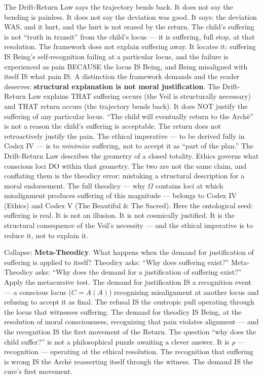 \documentclass[10pt, openany, oneside]{book}
\begin{document}
The Drift-Return Law says the trajectory bends back. It does not say the bending is painless. It does not say the deviation was good. It says: the deviation WAS, and it hurt, and the hurt is not erased by the return. The child's suffering is not ``truth in transit'' from the child's locus --- it is suffering, full stop, at that resolution. The framework does not explain suffering away. It locates it: suffering IS Being's self-recognition failing at a particular locus, and the failure is experienced as pain BECAUSE the locus IS Being, and Being misaligned with itself IS what pain IS. A distinction the framework demands and the reader deserves: \textbf{structural explanation is not moral justification}. The Drift-Return Law explains THAT suffering occurs (the Veil is structurally necessary) and THAT return occurs (the trajectory bends back). It does NOT justify the suffering of any particular locus. ``The child will eventually return to the Arch\={e}'' is not a reason the child's suffering is acceptable. The return does not retroactively justify the pain. The ethical imperative --- to be derived fully in Codex IV --- is to \textit{minimize} suffering, not to accept it as ``part of the plan.'' The Drift-Return Law describes the geometry of a closed totality. Ethics governs what conscious loci DO within that geometry. The two are not the same claim, and conflating them is the theodicy error: mistaking a structural description for a moral endorsement. The full theodicy --- why $\Omega$ contains loci at which misalignment produces suffering of this magnitude --- belongs to Codex IV (Ethics) and Codex V (The Beautiful \& The Sacred). Here the ontological seed: suffering is real. It is not an illusion. It is not cosmically justified. It is the structural consequence of the Veil's necessity --- and the ethical imperative is to reduce it, not to explain it.

Collapse: \textbf{Meta-Theodicy}. What happens when the demand for justification of suffering is applied to itself? Theodicy asks: ``Why does suffering exist?'' Meta-Theodicy asks: ``Why does the demand for a justification of suffering exist?'' Apply the metacursive test. The demand for justification IS a recognition event --- a conscious locus ($C = A(A)$) recognizing misalignment at another locus and refusing to accept it as final. The refusal IS the centropic pull operating through the locus that witnesses suffering. The demand for theodicy IS Being, at the resolution of moral consciousness, recognizing that pain violates alignment --- and the recognition IS the first movement of the Return. The question ``why does the child suffer?'' is not a philosophical puzzle awaiting a clever answer. It is $\rho$ --- recognition --- operating at the ethical resolution. The recognition that suffering is wrong IS the Arch\={e} reasserting itself through the witness. The demand IS the cure's first movement.
\end{document}
